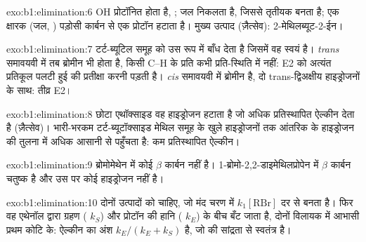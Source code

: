 \begin{solution}{exo:b1:elimination:6}
OH प्रोटॉनित होता है, ; जल निकलता है, जिससे तृतीयक
  बनता है; एक क्षारक (जल, ) पड़ोसी कार्बन से
एक प्रोटॉन हटाता है। मुख्य उत्पाद (ज़ैत्सेव):
2-मेथिलब्यूट-2-ईन।
\end{solution}

\begin{solution}{exo:b1:elimination:7}
टर्ट-ब्यूटिल समूह  को उस रूप में बाँध देता है जिसमें वह स्वयं  है।
\textit{trans} समावयवी में तब ब्रोमीन भी  होता है, किसी C--H के प्रति
कभी प्रति-स्थिति में नहीं: E2 को अत्यंत प्रतिकूल पलटी हुई  की प्रतीक्षा करनी पड़ती है।
\textit{cis} समावयवी में ब्रोमीन  है, दो trans-द्विअक्षीय
हाइड्रोजनों के साथ: तीव्र E2।
\end{solution}

\begin{solution}{exo:b1:elimination:8}
छोटा एथॉक्साइड वह हाइड्रोजन हटाता है जो अधिक प्रतिस्थापित
ऐल्कीन देता है (ज़ैत्सेव)। भारी-भरकम टर्ट-ब्यूटॉक्साइड मेथिल समूह के खुले हाइड्रोजनों तक
आंतरिक  के हाइड्रोजन की तुलना में अधिक आसानी से
पहुँचता है: कम प्रतिस्थापित ऐल्कीन।
\end{solution}

\begin{solution}{exo:b1:elimination:9}
ब्रोमोमेथेन में कोई $\beta$ कार्बन नहीं है। 1-ब्रोमो-2,2-डाइमेथिलप्रोपेन में
$\beta$ कार्बन चतुष्क है और उस पर कोई हाइड्रोजन नहीं है।
\end{solution}

\begin{solution}{exo:b1:elimination:10}
दोनों उत्पादों को  चाहिए, जो मंद चरण में
$k_1[\mathrm{RBr}]$ दर से बनता है। फिर वह एथेनॉल द्वारा ग्रहण ( $k_S$) और प्रोटॉन की हानि ( $k_E$) के बीच बँट जाता है, दोनों
विलायक में आभासी प्रथम कोटि के: ऐल्कीन का अंश
$k_E/(k_E + k_S)$ है, जो  की सांद्रता से स्वतंत्र है।
\end{solution}

